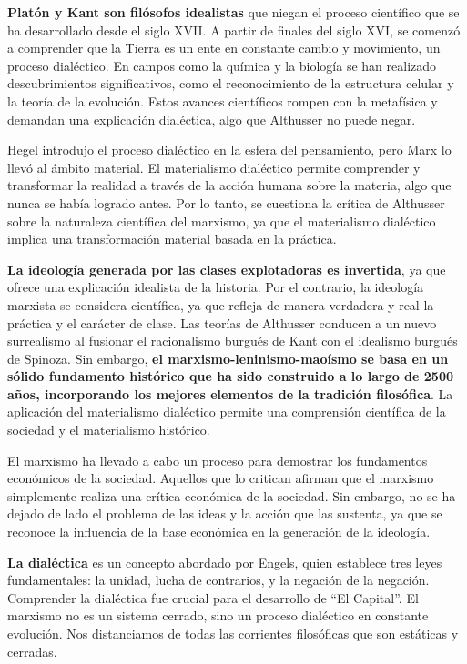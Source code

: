 \documentclass[
  a4paper,
]{article}
\begin{document}
\textbf{Platón y Kant son filósofos idealistas} que niegan el proceso
científico que se ha desarrollado desde el siglo XVII. A partir de
finales del siglo XVI, se comenzó a comprender que la Tierra es un ente
en constante cambio y movimiento, un proceso dialéctico. En campos como
la química y la biología se han realizado descubrimientos
significativos, como el reconocimiento de la estructura celular y la
teoría de la evolución. Estos avances científicos rompen con la
metafísica y demandan una explicación dialéctica, algo que Althusser no
puede negar.

Hegel introdujo el proceso dialéctico en la esfera del pensamiento, pero
Marx lo llevó al ámbito material. El materialismo dialéctico permite
comprender y transformar la realidad a través de la acción humana sobre
la materia, algo que nunca se había logrado antes. Por lo tanto, se
cuestiona la crítica de Althusser sobre la naturaleza científica del
marxismo, ya que el materialismo dialéctico implica una transformación
material basada en la práctica.

\textbf{La ideología generada por las clases explotadoras es invertida},
ya que ofrece una explicación idealista de la historia. Por el
contrario, la ideología marxista se considera científica, ya que refleja
de manera verdadera y real la práctica y el carácter de clase. Las
teorías de Althusser conducen a un nuevo surrealismo al fusionar el
racionalismo burgués de Kant con el idealismo burgués de Spinoza. Sin
embargo, \textbf{el marxismo-leninismo-maoísmo se basa en un sólido
fundamento histórico que ha sido construido a lo largo de 2500 años,
incorporando los mejores elementos de la tradición filosófica}. La
aplicación del materialismo dialéctico permite una comprensión
científica de la sociedad y el materialismo histórico.

El marxismo ha llevado a cabo un proceso para demostrar los fundamentos
económicos de la sociedad. Aquellos que lo critican afirman que el
marxismo simplemente realiza una crítica económica de la sociedad. Sin
embargo, no se ha dejado de lado el problema de las ideas y la acción
que las sustenta, ya que se reconoce la influencia de la base económica
en la generación de la ideología.

\textbf{La dialéctica} es un concepto abordado por Engels, quien
establece tres leyes fundamentales: la unidad, lucha de contrarios, y la
negación de la negación. Comprender la dialéctica fue crucial para el
desarrollo de ``El Capital''. El marxismo no es un sistema cerrado, sino
un proceso dialéctico en constante evolución. Nos distanciamos de todas
las corrientes filosóficas que son estáticas y cerradas.
\end{document}

